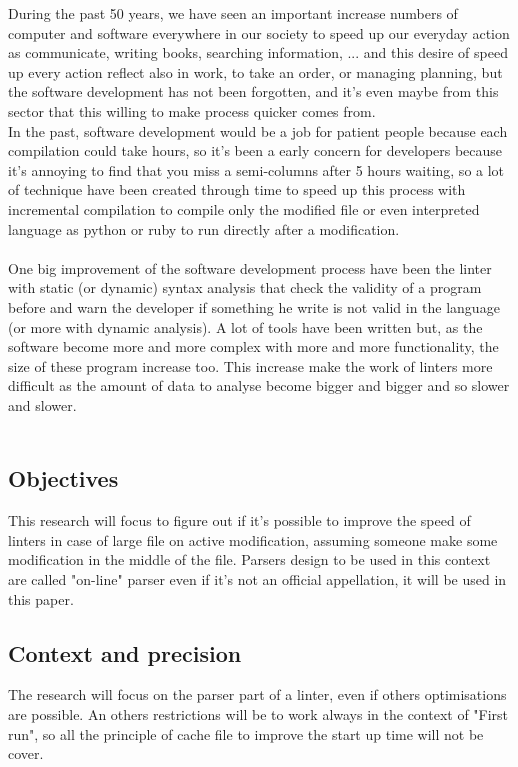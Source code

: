 During the past 50 years, we have seen an important increase numbers of computer and software everywhere in our society to speed up our everyday action as communicate, writing books, searching information, ... and this desire of speed up every action reflect also in work, to take an order, or managing planning, but the software development has not been forgotten, and it's even maybe from this sector that this willing to make process quicker comes from.
\\
In the past, software development would be a job for patient people because each compilation could take hours, so it's been a early concern for developers because it's annoying to find that you miss a semi-columns after 5 hours waiting, so a lot of technique have been created through time to speed up this process with incremental compilation to compile only the modified file or even interpreted language as python or ruby to run directly after a modification.
\\
\\
One big improvement of the software development process have been the linter with static (or dynamic) syntax analysis that check the validity of a program before and warn the developer if something he write is not valid in the language (or more with dynamic analysis). A lot of tools have been written but, as the software become more and more complex with more and more functionality, the size of these program increase too. This increase make the work of linters more difficult as the amount of data to analyse become bigger and bigger and so slower and slower.
\\
\\
\subsection{Objectives}
This research will focus to figure out if it's possible to improve the speed of linters in case of large file on active modification, assuming someone make some modification in the middle of the file. Parsers design to be used in this context are called "on-line" parser even if it's not an official appellation, it will be used in this paper.
\\
\subsection{Context and precision}
The research will focus on the parser part of a linter, even if others optimisations are possible.
An others restrictions will be to work always in the context of "First run", so all the principle of cache file to improve the start up time will not be cover. 
